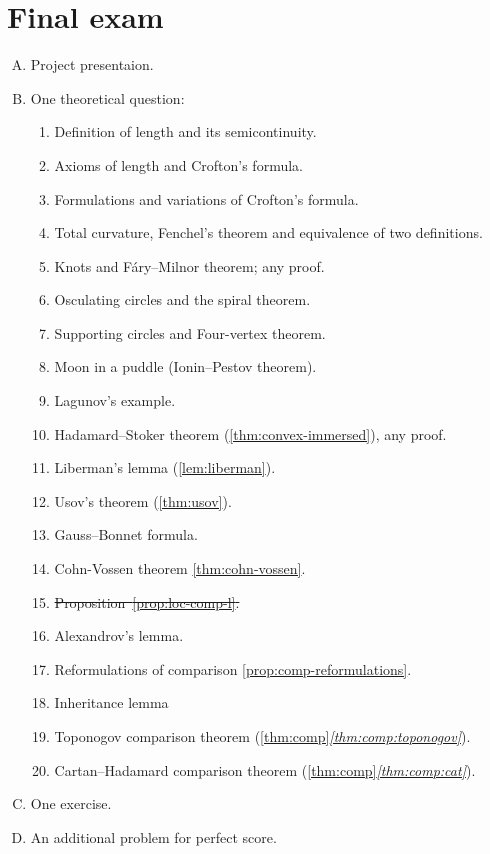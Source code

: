 \chapter{Final exam}


\begin{enumerate}[A.]
\item Project presentaion.
\item One theoretical question:
\begin{enumerate}[1.]
\item Definition of length and its semicontinuity.
\item Axioms of length and Crofton's formula.
\item Formulations and variations of Crofton's formula.
\item Total curvature, Fenchel's theorem and equivalence of two definitions.
\item Knots and F\'ary--Milnor theorem; any proof.
\item Osculating circles and the spiral theorem.
\item Supporting circles and Four-vertex theorem. 
\item Moon in a puddle (Ionin--Pestov theorem).
\item Lagunov's example.
\item Hadamard--Stoker theorem (\ref{thm:convex-immersed}), any proof.
\item Liberman's lemma (\ref{lem:liberman}).
\item Usov's theorem (\ref{thm:usov}).
\item Gauss--Bonnet formula.
\item Cohn-Vossen theorem \ref{thm:cohn-vossen}.
\item \sout{Proposition~\ref{prop:loc-comp-l}.}
\item Alexandrov's lemma.
\item Reformulations of comparison \ref{prop:comp-reformulations}.
\item Inheritance lemma
\item Toponogov comparison theorem (\ref{thm:comp}\textit{\ref{thm:comp:toponogov}}).
\item Cartan--Hadamard comparison theorem (\ref{thm:comp}\textit{\ref{thm:comp:cat}}).
\end{enumerate}

\item One exercise.

\item An additional problem for perfect score.
\end{enumerate}


